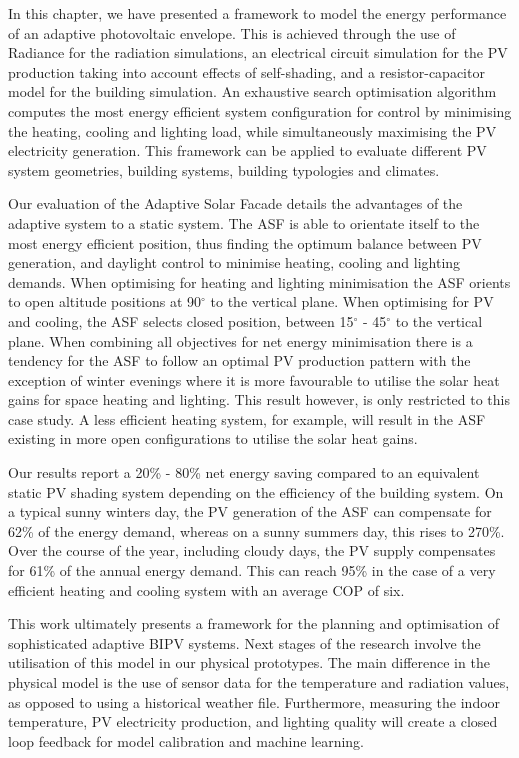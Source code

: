 
In this chapter, we have presented a framework to model the energy performance of an adaptive photovoltaic envelope. This is achieved through the use of Radiance for the radiation simulations, an electrical circuit simulation for the PV production taking into account effects of self-shading, and a resistor-capacitor model for the building simulation. An exhaustive search optimisation algorithm computes the most energy efficient system configuration for control by minimising the heating, cooling and lighting load, while simultaneously maximising the PV electricity generation. This framework can be applied to evaluate different PV system geometries, building systems, building typologies and climates.

Our evaluation of the Adaptive Solar Facade details the advantages of the adaptive system to a static system. The ASF is able to orientate itself to the most energy efficient position, thus finding the optimum balance between PV generation, and daylight control to minimise heating, cooling and lighting demands. When optimising for heating and lighting minimisation the ASF orients to open altitude positions at 90$^{\circ}$ to the vertical plane. When optimising for PV and cooling, the ASF selects closed position, between 15$^{\circ}$ - 45$^{\circ}$ to the vertical plane. When combining all objectives for net energy minimisation there is a tendency for the ASF to follow an optimal PV production pattern with the exception of winter evenings where it is more favourable to utilise the solar heat gains for space heating and lighting. This result however, is only restricted to this case study. A less efficient heating system, for example, will result in the ASF existing in more open configurations to utilise the solar heat gains.


Our results report a 20\% - 80\% net energy saving compared to an equivalent static PV shading system depending on the efficiency of the building system. On a typical sunny winters day, the PV generation of the ASF can compensate for 62\% of the energy demand, whereas on a sunny summers day, this rises to 270\%. Over the course of the year, including cloudy days, the PV supply compensates for 61\% of the annual energy demand. This can reach 95\% in the case of a very efficient heating and cooling system with an average COP of six.

This work ultimately presents a framework for the planning and optimisation of sophisticated adaptive BIPV systems. Next stages of the research involve the utilisation of this model in our physical prototypes. The main difference in the physical model is the use of sensor data for the temperature and radiation values, as opposed to using a historical weather file. Furthermore, measuring the indoor temperature, PV electricity production, and lighting quality will create a closed loop feedback for model calibration and machine learning. 






